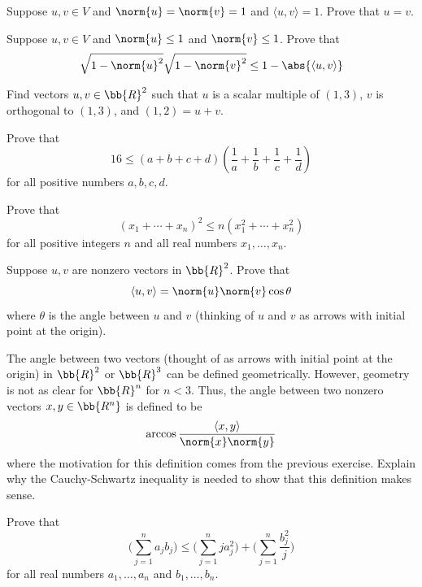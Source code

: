 \documentclass[12pt,letterpaper]{hmcpset}
\begin{document}
\begin{problem}[8]
	Suppose $u, v \in V$ and $\norm{u} = \norm{v} = 1$ and $\langle u, v \rangle = 1$. Prove that $u = v$.
\end{problem}

\begin{problem}[9]
	Suppose $u, v \in V$ and $\norm{u} \le 1$ and $\norm{v} \le 1$. Prove that
	\[
		\sqrt{1 - \norm{u}^2} \sqrt{1 - \norm{v}^2} \le 1 - \abs{\langle u, v \rangle}
	\]
\end{problem}

\begin{problem}[10]
	Find vectors $u, v \in \bb{R}^2$ such that $u$ is a scalar multiple of $(1, 3)$, $v$ is orthogonal to $(1, 3)$, and $(1, 2) = u + v.$
\end{problem}

\begin{problem}[11]
	Prove that
	\[
		16 \le (a + b + c + d)(\frac{1}{a} + \frac{1}{b} + \frac{1}{c} + \frac{1}{d})
	\]
	for all positive numbers $a, b, c, d$.
\end{problem}

\begin{problem}[12]
	Prove that
	\[
		(x_1 + \cdots + x_n)^2 \le n (x_1^2 + \cdots + x_n^2)
	\]
	for all positive integers $n$ and all real numbers $x_1, \ldots, x_n$.
\end{problem}

\begin{problem}[13]
	Suppose $u, v$ are nonzero vectors in $\bb{R}^2$. Prove that
	\[
		\langle u, v \rangle = \norm{u} \norm{v} \cos{\theta}
	\]
	where $\theta$ is the angle between $u$ and $v$ (thinking of $u$ and $v$ as arrows with initial point at the origin).
\end{problem}

\begin{problem}[14]
	The angle between two vectors (thought of as arrows with initial point at the origin) in $\bb{R}^2$ or $\bb{R}^3$ can be defined geometrically. However, geometry is not as clear for $\bb{R}^n$ for $n < 3$. Thus, the angle between two nonzero vectors $x, y \in \bb{R^n}$ is defined to be
	\[
		\arccos{\frac{\langle x, y \rangle}{\norm{x} \norm{y}}}
	\]
	where the motivation for this definition comes from the previous exercise. Explain why the Cauchy-Schwartz inequality is needed to show that this definition makes sense.
\end{problem}

\begin{problem}[15]
	Prove that
	\[
		\Big(\sum_{j = 1}^n a_j b_j \Big) \le \Big(\sum_{j = 1}^n j a_j^2 \Big) + \Big(\sum_{j = 1}^n \frac{b_j^2}{j} \Big) 
	\]
	for all real numbers $a_1, \ldots, a_n$ and $b_1, \ldots, b_n$.
\end{problem}
\end{document}
